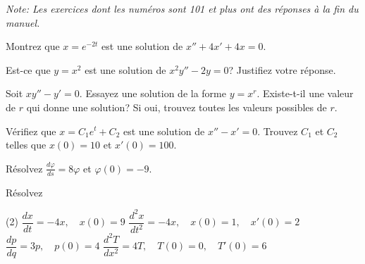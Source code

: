 \noindent
\emph{Note: Les exercices dont les numéros sont 101 et plus ont des réponses à la fin du manuel.}


\setcounter{exercise}{100}

\begin{exercise}
	Montrez que $x = e^{-2t}$ est une solution de $x'' + 4x' + 4x = 0$.
\end{exercise}

\begin{exercise}
	Est-ce que $y = x^2$ est une solution de $x^2y'' - 2y = 0$?  Justifiez votre réponse.
\end{exercise}

\begin{exercise}
	Soit $xy'' - y' = 0$.  Essayez une solution de la forme $y = x^r$.
	Existe-t-il une valeur de $r$ qui donne une solution?
	Si oui, trouvez toutes les valeurs possibles de $r$.
\end{exercise}


\begin{exercise}
	Vérifiez que $x=C_1e^t+C_2$ est une solution de $x''-x' = 0$.
	Trouvez $C_1$ et $C_2$ telles que $x(0) = 10$ et $x'(0) = 100$.
\end{exercise}

\begin{exercise}
	Résolvez $\frac{d\varphi}{ds} = 8 \varphi$ et $\varphi(0) = -9$.
\end{exercise}

\begin{exercise}
	Résolvez
	\begin{tasks}(2)
	\task $\dfrac{dx}{dt} = -4x, \quad x(0)=9$
	\task $\dfrac{d^2x}{dt^2} = -4x, \quad x(0)=1, \quad x'(0)=2$
	\task $\dfrac{dp}{dq} = 3 p, \quad p(0)=4$
	\task $\dfrac{d^2T}{dx^2} = 4 T, \quad T(0)=0, \quad T'(0)=6$
	\end{tasks}
\end{exercise}


